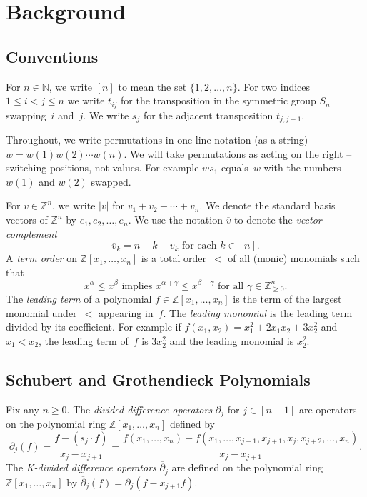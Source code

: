 \documentclass[ALCO]{cedram}
\begin{document}
\section{Background} 
\label{sec:back}

\subsection{Conventions}
For $n\in \mathbb{N}$, we write $[n]$ to mean the set $\{1,2,\ldots,n \}$. For two indices $1\leq i<j\leq n$ we write $t_{ij}$ for the transposition in the symmetric group $S_n$ swapping~$i$ and~$j$. We write $s_j$ for the adjacent transposition $t_{j,j+1}$.

Throughout, we write permutations in one-line notation (as a string) $w=w(1)w(2)\cdots w(n)$. We will take permutations as acting on the right -- switching positions, not values. For example $ws_1$ equals~$w$ with the numbers $w(1)$ and $w(2)$ swapped. 

For $v\in \mathbb{Z}^n$, we write $|v|$ for $v_1+v_2+\cdots+v_n$. We denote the standard basis vectors of $\mathbb{Z}^n$ by $e_1,e_2,\ldots,e_n$. 
We use the notation $\overline{v}$ to denote the \emph{vector complement} 
\[\overline{v}_k = n-k - v_k \mbox{ for each } k\in[n].\]
A \emph{term order} on $\mathbb{Z}[x_1,\ldots,x_n]$ is a total order~$<$ of all (monic) monomials such that
\[x^{\alpha}\leq x^{\beta}\mbox{ implies } x^{\alpha+\gamma}\leq x^{\beta+\gamma} \mbox{ for all }\gamma\in\mathbb{Z}^n_{\geq 0}. \]
The \emph{leading term} of a polynomial $f\in \mathbb{Z}[x_1,\ldots,x_n]$ is the term of the largest monomial under~$<$ appearing in~$f$. The \emph{leading monomial} is the leading term divided by its coefficient. For example if $f(x_1,x_2)=x_1^2+2x_1x_2+3x_2^2$ and $x_1<x_2$, the leading term of~$f$ is $3x_2^2$ and the leading monomial is $x_2^2$.

\subsection{Schubert and Grothendieck Polynomials}

\begin{definition}
	Fix any $n\geq 0$. The \emph{divided difference operators} $\partial_j$ for $j\in[n-1]$ are operators on the polynomial ring $\mathbb{Z}[x_1,\ldots,x_n]$ defined by
	\[\partial_j(f)=\frac{f-(s_j\cdot f)}{x_j-x_{j+1}}
	=\frac{f(x_1,\ldots,x_n)-f(x_1,\ldots,x_{j-1},x_{j+1},x_j,x_{j+2},\ldots,x_n)}{x_j-x_{j+1}}.\]
	The \emph{K-divided difference operators} $\overline{\partial}_j$ are defined on the polynomial ring $\mathbb{Z}[x_1,\ldots,x_n]$ by
	$\overline{\partial}_j(f)=\partial_j(f-x_{j+1}f)$.
\end{definition}
\end{document}
